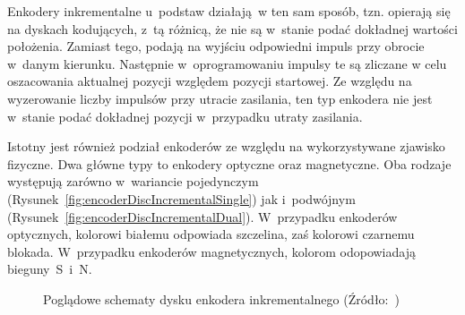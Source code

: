 Enkodery inkrementalne u~podstaw działają~w ten sam sposób, tzn. opierają się na dyskach kodujących, z~tą różnicą, że nie są w~stanie podać dokładnej wartości położenia. Zamiast tego, podają na wyjściu odpowiedni impuls przy obrocie w~danym kierunku. Następnie w~oprogramowaniu impulsy te są zliczane w celu oszacowania aktualnej pozycji względem pozycji startowej. Ze względu na wyzerowanie liczby impulsów przy utracie zasilania, ten typ enkodera nie jest w~stanie podać dokładnej pozycji w~przypadku utraty zasilania.

Istotny jest również podział enkoderów ze względu na wykorzystywane zjawisko fizyczne. Dwa główne typy to enkodery optyczne oraz magnetyczne. Oba rodzaje występują zarówno w~wariancie pojedynczym (Rysunek~\ref{fig:encoderDiscIncrementalSingle}) jak i~podwójnym (Rysunek~\ref{fig:encoderDiscIncrementalDual}). W~przypadku enkoderów optycznych, kolorowi białemu odpowiada szczelina, zaś kolorowi czarnemu blokada. W~przypadku enkoderów magnetycznych, kolorom odopowiadają bieguny~S~i~N.

\begin{figure}
    \centering
    \qquad
    \caption{Poglądowe schematy dysku enkodera inkrementalnego (Źródło:~\cite{bib:tarczeenkoderowinkrementalnych})}
\end{figure}

